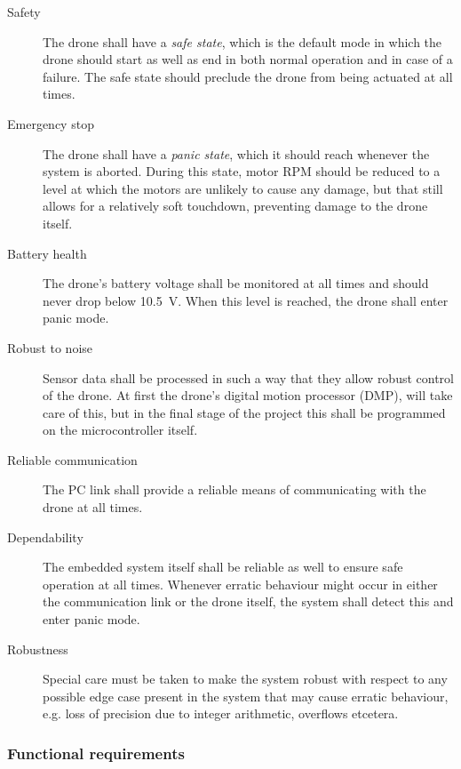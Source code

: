 \documentclass[final]{article}
\begin{document}
\begin{description}
	\item[Safety] The drone shall have a \emph{safe state}, which is the default mode in which the drone should start as well as end in both normal operation and in case of a failure. The safe state should preclude the drone from being actuated at all times.
	\item[Emergency stop] The drone shall have a \emph{panic state}, which it should reach whenever the system is aborted. During this state, motor RPM should be reduced to a level at which the motors are unlikely to cause any damage, but that still allows for a relatively soft touchdown, preventing damage to the drone itself.
	\item[Battery health] The drone's battery voltage shall be monitored at all times and should never drop below \SI{10.5}{\volt}. When this level is reached, the drone shall enter panic mode.
	\item[Robust to noise] Sensor data shall be processed in such a way that they allow robust control of the drone. At first the drone's digital motion processor (DMP), will take care of this, but in the final stage of the project this shall be programmed on the microcontroller itself.
	\item[Reliable communication] The PC link shall provide a reliable means of communicating with the drone at all times.
	\item[Dependability] The embedded system itself shall be reliable as well to ensure safe operation at all times. Whenever erratic behaviour might occur in either the communication link or the drone itself, the system shall detect this and enter panic mode.
	\item[Robustness] Special care must be taken to make the system robust with respect to any possible edge case present in the system that may cause erratic behaviour, e.g. loss of precision due to integer arithmetic, overflows etcetera.
\end{description}

\subsubsection{Functional requirements}
\end{document}
